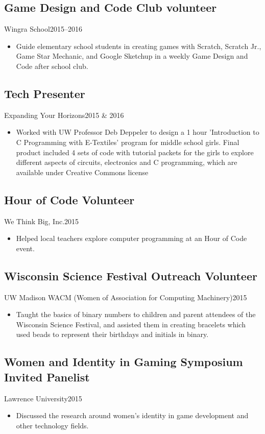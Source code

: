 \documentclass[../main.tex]{subfiles}
\begin{document}
\subsection{Game Design and Code Club volunteer}{Wingra School}{2015--2016}{}
\begin{itemize}
		\item{Guide elementary school students in creating games with Scratch, Scratch Jr., Game Star Mechanic, and Google Sketchup in a weekly Game Design and Code after school club.}
	\end{itemize}

\subsection{Tech Presenter}{Expanding Your Horizons}{2015 \& 2016}{}
\begin{itemize}
		\item{Worked with UW Professor Deb Deppeler to design a 1 hour 'Introduction to C Programming with E-Textiles' program for middle school girls. Final product included 4 sets of code with tutorial packets for the girls to explore different aspects of circuits, electronics and C programming, which are available under Creative Commons license}
	\end{itemize}


\subsection{Hour of Code Volunteer}{We Think Big, Inc.}{2015}{}
\begin{itemize}
		\item{Helped local teachers explore computer programming at an Hour of Code event.}
	\end{itemize}

\subsection{Wisconsin Science Festival Outreach Volunteer}{
UW Madison WACM (Women of Association for Computing Machinery)}{2015}{}
\begin{itemize}
		\item{Taught the basics of binary numbers to children and parent attendees of the Wisconsin Science Festival, and assisted them in creating bracelets which used beads to represent their birthdays and initials in binary.}
	\end{itemize}


\subsection{Women and Identity in Gaming Symposium Invited Panelist}{Lawrence University}{2015}{}
\begin{itemize}
		\item{Discussed the research around women's identity in game development and other technology fields.}
	\end{itemize}
\end{document}

